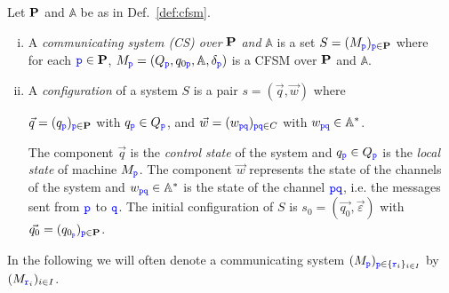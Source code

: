 \begin{definition}%
Let $\roles$  and $\mathbb{A}$ be as in Def.~\ref{def:cfsm}.
\begin{enumerate}[i)]
\item
A {\em communicating system (CS)
over} $\roles$ \emph{and} $\mathbb{A}$ is a  set  %
$S= (M_\ttp)_{\ttp\in\roles}$
where\\
for each $\ttp\in \roles$,
$M_\ttp=(Q_\ttp,q_{0\ttp},\mathbb{A},\delta_\ttp)$ is a CFSM  over $\roles$ and $\mathbb{A}$.
\item
A {\em configuration} of a system $S$ is a pair $s = (\vec{q},\vec{w})$
where\\
\centerline{$\vec{q}= (q_\ttp)_{\ttp\in\roles}$ with $q_\ttp \in Q_\ttp$,
\qquad and \qquad  $\vec{w}  = (w_{\ttp\ttq})_{\ttp\ttq\in C}$ with $w_{\ttp\ttq}\in\mathbb{A^*}$.}

The component $\vec{q}$ is the {\em control state\/} of the system and $q_\ttp \in Q_\ttp$ is the 
{\em local state\/} of machine $M_\ttp$. 
The component $\vec{w}$ represents the state of the channels of the system and $w_{\ttp\ttq} \in \mathbb{A}^*$ is the state of the channel $\ttp\ttq$, i.e. the messages sent from $\ttp$ to $\ttq$. The initial configuration of $S$ is $s_0=  (\vec{q_0},\vec{\varepsilon})$
with $\vec{{q_0}} = (q_{0_\ttp})_{\ttp\in\roles}$.
\end{enumerate}
\end{definition}

\noindent
In the following we will often denote a communicating system $(M_{\ttp})_{\ttp\in \Set{\ttr_i}_{i\in I}}$ by $(M_{\ttr_i})_{i\in I}$.



